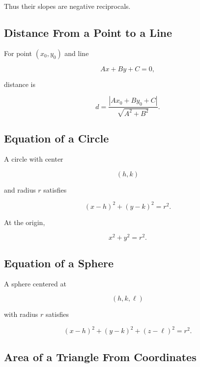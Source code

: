 Thus their slopes are negative reciprocals.

\subsection{Distance From a Point to a Line}
\label{subsec:point-line-distance}

For point \((x_0,y_0)\) and line

\[
Ax+By+C=0,
\]

distance is

\[
\boxed{
d
=
\frac{
|Ax_0+By_0+C|
}{
\sqrt{A^2+B^2}
}.
}
\]

\subsection{Equation of a Circle}
\label{subsec:circle-equation-reference}

A circle with center

\[
(h,k)
\]

and radius \(r\) satisfies

\[
\boxed{
(x-h)^2
+
(y-k)^2
=
r^2.
}
\]

At the origin,

\[
\boxed{
x^2+y^2=r^2.
}
\]

\subsection{Equation of a Sphere}
\label{subsec:sphere-equation-reference}

A sphere centered at

\[
(h,k,\ell)
\]

with radius \(r\) satisfies

\[
\boxed{
(x-h)^2
+
(y-k)^2
+
(z-\ell)^2
=
r^2.
}
\]

\subsection{Area of a Triangle From Coordinates}
\label{subsec:coordinate-triangle-area}

